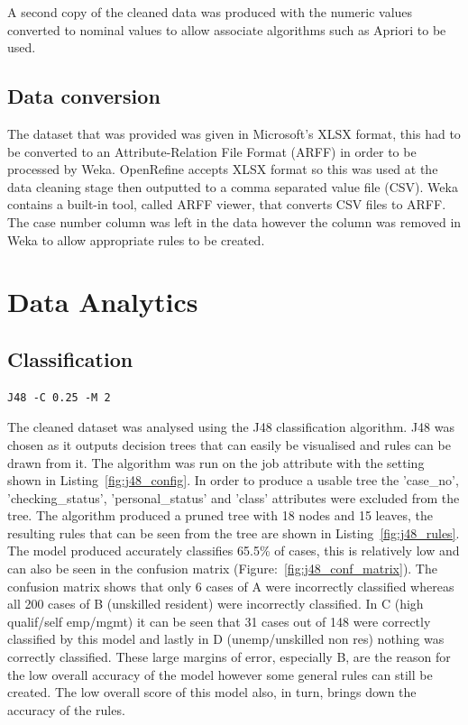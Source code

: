 \documentclass[12pt]{article}
\begin{document}
A second copy of the cleaned data was produced with the numeric values converted to nominal values to allow associate algorithms such as Apriori to be used.

\subsection{Data conversion}
The dataset that was provided was given in Microsoft's XLSX format, this had to be converted to an Attribute-Relation File Format (ARFF) in order to be processed by Weka. OpenRefine accepts XLSX format so this was used at the data cleaning stage then outputted to a comma separated value file (CSV). Weka contains a built-in tool, called ARFF viewer, that converts CSV files to ARFF. The case number column was left in the data however the column was removed in Weka to allow appropriate rules to be created.
\section{Data Analytics}
\subsection{Classification}

\begin{lstlisting}[caption="J48 configuration"\label{fig:j48_config}]
J48 -C 0.25 -M 2
\end{lstlisting}

The cleaned dataset was analysed using the J48 classification algorithm. J48 was chosen as it outputs decision trees that can easily be visualised and rules can be drawn from it. The algorithm was run on the job attribute with the setting shown in Listing~\ref{fig:j48_config}. In order to produce a usable tree the 'case\_no', 'checking\_status', 'personal\_status' and 'class' attributes were excluded from the tree. The algorithm produced a pruned tree with 18 nodes and 15 leaves, the resulting rules that can be seen from the tree are shown in Listing~\ref{fig:j48_rules}. The model produced accurately classifies 65.5\% of cases, this is relatively low and can also be seen in the confusion matrix (Figure:~\ref{fig:j48_conf_matrix}). The confusion matrix shows that only 6 cases of A were incorrectly classified whereas all 200 cases of B (unskilled resident) were incorrectly classified. In C (high qualif/self emp/mgmt) it can be seen that 31 cases out of 148 were correctly classified by this model and lastly in D (unemp/unskilled non res) nothing was correctly classified. These large margins of error, especially B, are the reason for the low overall accuracy of the model however some general rules can still be created. The low overall score of this model also, in turn, brings down the accuracy of the rules.
\end{document}
